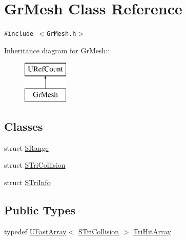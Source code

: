 \hypertarget{class_gr_mesh}{
\section{GrMesh Class Reference}
\label{class_gr_mesh}
}
{\tt \#include $<$GrMesh.h$>$}

Inheritance diagram for GrMesh::\begin{figure}[H]
\begin{center}
\leavevmode
\includegraphics[height=2cm]{class_gr_mesh}
\end{center}
\end{figure}
\subsection*{Classes}
\begin{CompactItemize}
\item 
struct \hyperlink{struct_gr_mesh_1_1_s_range}{SRange}
\item 
struct \hyperlink{struct_gr_mesh_1_1_s_tri_collision}{STriCollision}
\item 
struct \hyperlink{struct_gr_mesh_1_1_s_tri_info}{STriInfo}
\end{CompactItemize}
\subsection*{Public Types}
\begin{CompactItemize}
\item 
typedef \hyperlink{class_u_fast_array}{UFastArray}$<$ \hyperlink{struct_gr_mesh_1_1_s_tri_collision}{STriCollision} $>$ \hyperlink{class_gr_mesh_9c88d279a741b50fc9011262f7d73b81}{TriHitArray}
\end{CompactItemize}
